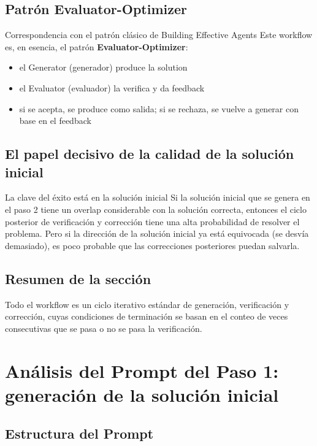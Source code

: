 \documentclass[a4paper]{article}
\begin{document}
\subsection{Patrón Evaluator-Optimizer}

\begin{knowledgebox}{Correspondencia con el patrón clásico de Building Effective Agents}
Este workflow es, en esencia, el patrón \textbf{Evaluator-Optimizer}:
\begin{itemize}
    \item el Generator (generador) produce la solution
    \item el Evaluator (evaluador) la verifica y da feedback
    \item si se acepta, se produce como salida; si se rechaza, se vuelve a generar con base en el feedback
\end{itemize}
\end{knowledgebox}

\subsection{El papel decisivo de la calidad de la solución inicial}

\begin{warningbox}{La clave del éxito está en la solución inicial}
Si la solución inicial que se genera en el paso 2 tiene un overlap considerable con la solución correcta, entonces el ciclo posterior de verificación y corrección tiene una alta probabilidad de resolver el problema. Pero si la dirección de la solución inicial ya está equivocada (se desvía demasiado), es poco probable que las correcciones posteriores puedan salvarla.
\end{warningbox}

\subsection{Resumen de la sección}

Todo el workflow es un ciclo iterativo estándar de generación, verificación y corrección, cuyas condiciones de terminación se basan en el conteo de veces consecutivas que se pasa o no se pasa la verificación.
\section{Análisis del Prompt del Paso 1: generación de la solución inicial}

\subsection{Estructura del Prompt}
\end{document}
